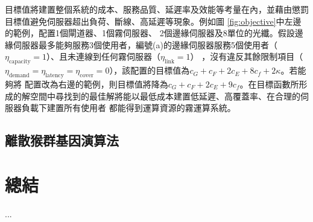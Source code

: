 目標值將建置整個系統的成本、服務品質、延遲率及效能等考量在內，並藉由懲罰目標值避免伺服器超出負荷、斷線、高延遲等現象。例如圖 \ref{fig:objective}中左邊的範例，配置1個閘道器、1個霧伺服器、
2個邊緣伺服器及8單位的光纖。假設邊緣伺服器最多能夠服務3個使用者，編號(a)的邊緣伺服器服務5個使用者（$\eta_{\text{capacity}} = 1$）、且未連線到任何霧伺服器（$\eta_{\text{link}} = 1$）
，沒有違反其餘限制項目（$\eta_{\text{demand}} = \eta_{\text{latency}} = \eta_{\text{cover}} = 0$），該配置的目標值為$c_G + c_F + 2c_E + 8c_f + 2\kappa$。若能夠將
配置改為右邊的範例，則目標值將降為$c_G + c_F + 2c_E + 9c_f$。在目標函數所形成的解空間中尋找到的最佳解將能以最低成本建置低延遲、高覆蓋率、在合理的伺服器負載下建置所有使用者
都能得到運算資源的霧運算系統。




\subsection{離散猴群基因演算法}
\label{section:dmga}




\section{總結}
...